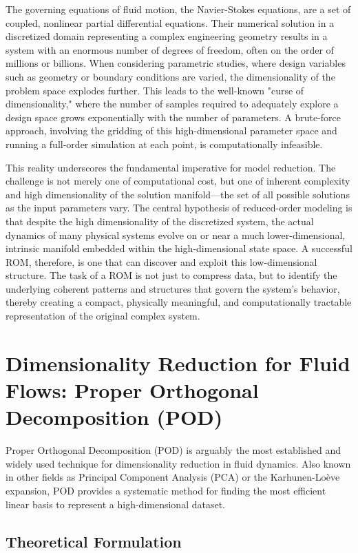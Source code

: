 \documentclass[dscexam, EN]{ufabcFHZh}
\begin{document}
The governing equations of fluid motion, the Navier-Stokes equations, are a set of coupled, nonlinear partial differential equations. Their numerical solution in a discretized domain representing a complex engineering geometry results in a system with an enormous number of degrees of freedom, often on the order of millions or billions. When considering parametric studies, where design variables such as geometry or boundary conditions are varied, the dimensionality of the problem space explodes further. This leads to the well-known "curse of dimensionality," where the number of samples required to adequately explore a design space grows exponentially with the number of parameters. A brute-force approach, involving the gridding of this high-dimensional parameter space and running a full-order simulation at each point, is computationally infeasible.

This reality underscores the fundamental imperative for model reduction. The challenge is not merely one of computational cost, but one of inherent complexity and high dimensionality of the solution manifold—the set of all possible solutions as the input parameters vary. The central hypothesis of reduced-order modeling is that despite the high dimensionality of the discretized system, the actual dynamics of many physical systems evolve on or near a much lower-dimensional, intrinsic manifold embedded within the high-dimensional state space. A successful ROM, therefore, is one that can discover and exploit this low-dimensional structure. The task of a ROM is not just to compress data, but to identify the underlying coherent patterns and structures that govern the system's behavior, thereby creating a compact, physically meaningful, and computationally tractable representation of the original complex system.

\section{Dimensionality Reduction for Fluid Flows: Proper Orthogonal Decomposition (POD)}

Proper Orthogonal Decomposition (POD) is arguably the most established and widely used technique for dimensionality reduction in fluid dynamics. Also known in other fields as Principal Component Analysis (PCA) or the Karhunen-Loève expansion, POD provides a systematic method for finding the most efficient linear basis to represent a high-dimensional dataset. 

\subsection{Theoretical Formulation}
\end{document}

